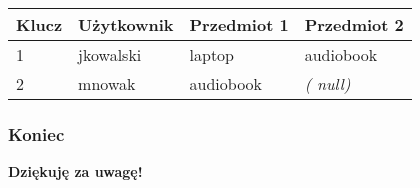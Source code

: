 \documentclass{beamer}
\begin{document}
\begin{frame}
		\begin{center}
			\begin{tabular}{l|l|l|l}
				\multicolumn{1}{c}{\textbf{Klucz}} & \multicolumn{1}{c}{\textbf{Użytkownik}} & \multicolumn{1}{c}{\textbf{Przedmiot 1}} & \textbf{Przedmiot 2} \\
				\hline
				\cellcolor{red!10}1 & \cellcolor{yellow!10}jkowalski & \cellcolor{yellow!10}laptop & \cellcolor{yellow!10}audiobook \\
				\hline
				\cellcolor{red!10}2 & \cellcolor{yellow!10}mnowak & \cellcolor{yellow!10}audiobook & \cellcolor{yellow!10}\textit{(
				null)} \\
				\hline
			\end{tabular}
		\end{center}
	\end{frame}

	\begin{frame}
		\frametitle{Koniec}

		\begin{center}
			\LARGE \textbf{Dziękuję za uwagę!}
		\end{center}
	\end{frame}
\end{document}
